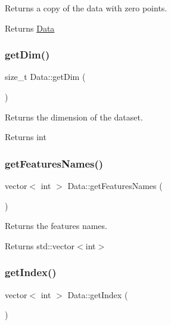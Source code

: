 Returns a copy of the data with zero points. 

\begin{DoxyReturn}{Returns}
\hyperlink{class_data}{Data} 
\end{DoxyReturn}
\mbox{\label{class_data_a7aba855040506ff3c7ce6ffb2b2773b4}} 
\subsubsection{\texorpdfstring{get\+Dim()}{getDim()}}
{\footnotesize\ttfamily size\+\_\+t Data\+::get\+Dim (\begin{DoxyParamCaption}{ }\end{DoxyParamCaption})\hspace{0.3cm}{\ttfamily [inline]}}



Returns the dimension of the dataset. 

\begin{DoxyReturn}{Returns}
int 
\end{DoxyReturn}
\mbox{\label{class_data_a2f6399baee6535e7f48250da54fbf00d}} 
\subsubsection{\texorpdfstring{get\+Features\+Names()}{getFeaturesNames()}}
{\footnotesize\ttfamily vector$<$ int $>$ Data\+::get\+Features\+Names (\begin{DoxyParamCaption}{ }\end{DoxyParamCaption})}



Returns the features names. 

\begin{DoxyReturn}{Returns}
std\+::vector$<$int$>$ 
\end{DoxyReturn}
\mbox{\label{class_data_a16685ae631c5bedc22c974980bc74c05}} 
\subsubsection{\texorpdfstring{get\+Index()}{getIndex()}}
{\footnotesize\ttfamily vector$<$ int $>$ Data\+::get\+Index (\begin{DoxyParamCaption}{ }\end{DoxyParamCaption})}



